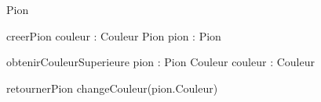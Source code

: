 \begin{algorithme}

  \begin{enregistrement}{Pion}
  \end{enregistrement}

  \vspace*{5mm} 
  
  \fonction
      {creerPion}
      {couleur : Couleur}
      {Pion}
      {pion : Pion}
      {{}

       {}}

  \vspace*{5mm} 
      
  \fonction
      {obtenirCouleurSuperieure}
      {pion : Pion}
      {Couleur}
      {couleur : Couleur}
      {}

  \vspace*{5mm} 
      
  \procedure
      {retournerPion}
      {}
      {}
      {changeCouleur(pion.Couleur)}

\end{algorithme}
